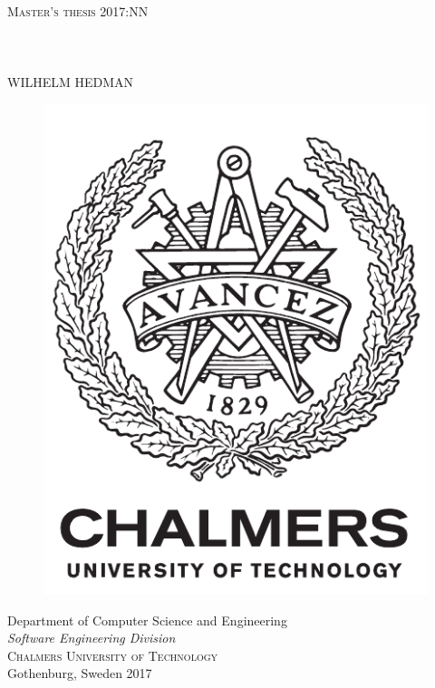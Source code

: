 \newpage
\thispagestyle{empty}
\begin{center}
	\textsc{\large Master's thesis 2017:NN}\\[4cm]		%
	\textbf{\Large \toptitle\\ \bottomtitle} \\[1cm]
	{\large \subt}\\[1cm]
	{\large WILHELM HEDMAN}
	
	\vfill	
	\begin{figure}[H]
	\centering
	\includegraphics[width=0.2\pdfpagewidth]{figure/auxiliary/logo_eng.pdf} \\	
	\end{figure}	\vspace{5mm}	
	
	Department of Computer Science and Engineering \\
	\emph{Software Engineering Division}\\
	\textsc{Chalmers University of Technology} \\
	Gothenburg, Sweden 2017 \\
\end{center}


